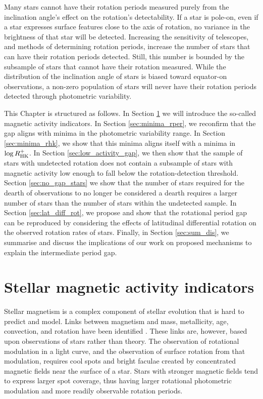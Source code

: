 Many stars cannot have their rotation periods measured purely from the inclination angle's effect on the rotation's detectability.
If a star is pole-on, even if a star expresses surface features close to the axis of rotation, no variance in the brightness of that star will be detected.
Increasing the sensitivity of telescopes, and methods of determining rotation periods, increase the number of stars that can have their rotation periods detected.
 Still, this number is bounded by the subsample of stars that cannot have their rotation measured.
While the distribution of the inclination angle of stars is biased toward equator-on observations, a non-zero population of stars will never have their rotation periods detected through photometric variability.

This Chapter is structured as follows. In Section \ref{sec:act_ind} we will introduce the so-called magnetic activity indicators. 
In Section \ref{sec:minima_rper}, we reconfirm that the gap aligns with minima in the photometric variability range. 
In Section \ref{sec:minima_rhk}, we show that this minima aligns itself with a minima in $\log R^{+}_{\rm{HK}}$.
In Section \ref{sec:low_activity_gap}, we then show that the sample of stars with undetected rotation does not contain a subsample of stars with magnetic activity low enough to fall below the rotation-detection threshold.
Section \ref{sec:no_gap_stars} we show that the number of stars required for the dearth of observations to no longer be considered a dearth requires a larger number of stars than the number of stars within the undetected sample.
In Section \ref{sec:lat_diff_rot}, we propose and show that the rotational period gap can be reproduced by considering the effects of latitudinal differential rotation on the observed rotation rates of stars.
Finally, in Section \ref{sec:sum_dis}, we summarise and discuss the implications of our work on proposed mechanisms to explain the intermediate period gap.


\section{Stellar magnetic activity indicators}
\label{sec:act_ind}

Stellar magnetism is a complex component of stellar evolution that is hard to predict and model.
Links between magnetism and mass, metallicity, age, convection, and rotation have been identified \citep{cao_starspots_2022}.
These links are, however, based upon observations of stars rather than theory.
The observation of rotational modulation in a light curve, and the observation of surface rotation from that modulation, requires cool spots and bright faculae created by concentrated magnetic fields near the surface of a star.
Stars with stronger magnetic fields tend to express larger spot coverage, thus having larger rotational photometric modulation and more readily observable rotation periods.

